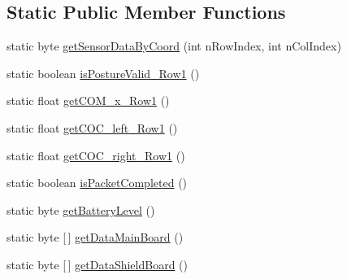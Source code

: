 \subsection*{Static Public Member Functions}
\begin{DoxyCompactItemize}
\item 
static byte \hyperlink{classcom_1_1nordicsemi_1_1venus_alpha01a_1_1_packet_parser_a5902ab2d7ddde3c7c7ef39db4235e11f}{get\+Sensor\+Data\+By\+Coord} (int n\+Row\+Index, int n\+Col\+Index)
\item 
static boolean \hyperlink{classcom_1_1nordicsemi_1_1venus_alpha01a_1_1_packet_parser_ad4128b5bdd18468d7e2650ffd19db2ee}{is\+Posture\+Valid\+\_\+\+Row1} ()
\item 
static float \hyperlink{classcom_1_1nordicsemi_1_1venus_alpha01a_1_1_packet_parser_a3a648107714bc21d5f02ded023a5220d}{get\+C\+O\+M\+\_\+x\+\_\+\+Row1} ()
\item 
static float \hyperlink{classcom_1_1nordicsemi_1_1venus_alpha01a_1_1_packet_parser_a1f32bc48e80d87f288037a25f8342165}{get\+C\+O\+C\+\_\+left\+\_\+\+Row1} ()
\item 
static float \hyperlink{classcom_1_1nordicsemi_1_1venus_alpha01a_1_1_packet_parser_a7f48168c8a7a596d599d26b8cb603141}{get\+C\+O\+C\+\_\+right\+\_\+\+Row1} ()
\item 
static boolean \hyperlink{classcom_1_1nordicsemi_1_1venus_alpha01a_1_1_packet_parser_ab20ec82e52b01d98648e1afe3ae98606}{is\+Packet\+Completed} ()
\item 
static byte \hyperlink{classcom_1_1nordicsemi_1_1venus_alpha01a_1_1_packet_parser_a24347083c8e46d2752850c037bd6b423}{get\+Battery\+Level} ()
\item 
static byte \mbox{[}$\,$\mbox{]} \hyperlink{classcom_1_1nordicsemi_1_1venus_alpha01a_1_1_packet_parser_a4341849d7819d55022bd4d34918d6dbb}{get\+Data\+Main\+Board} ()
\item 
static byte \mbox{[}$\,$\mbox{]} \hyperlink{classcom_1_1nordicsemi_1_1venus_alpha01a_1_1_packet_parser_a8a69d3cced18659e7445053519d7ba56}{get\+Data\+Shield\+Board} ()
\end{DoxyCompactItemize}
